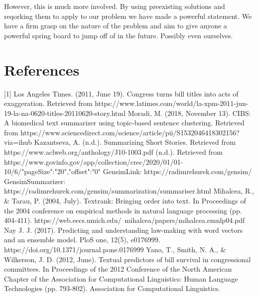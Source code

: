 \documentclass[11pt,a4paper]{article}
\begin{document}
However, this is much more involved. By using preexisting solutions and reqorking them to apply to our problem we have made a powerful statement. We have a firm grasp on the nature of the problem and aim to give anyone a powerful spring board to jump off of in the future. Possibly even ourselves. 
  
  

\clearpage
\section{References}

[1] Los Angeles Times. (2011, June 19). Congress turns bill titles into acts of exaggeration. Retrieved from https://www.latimes.com/world/la-xpm-2011-jun-19-la-na-0620-titles-20110620-story.html 
\newline
\newline
[2] Moradi, M. (2018, November 13). CIBS: A biomedical text summarizer using topic-based sentence clustering. Retrieved from https://www.sciencedirect.com/science/article/pii/S1532046418302156?via=ihub 
\newline
\newline
[3]Kazantseva, A. (n.d.). Summarizing Short Stories. Retrieved from https://www.aclweb.org/anthology/J10-1003.pdf 
\newline
\newline
[4] (n.d.). Retrieved from https://www.govinfo.gov/app/collection/crec/2020/01/01-10/6/{"pageSize":"20","offset":"0"} 
\newline
\newline
[5]GensimLink:
https://radimrehurek.com/gensim/
\newline
\newline
[6]GensimSummarizer:
https://radimrehurek.com/gensim/summarization/summariser.html
\newline
\newline
[7] Mihalcea, R., & Tarau, P. (2004, July). Textrank: Bringing order into text. In Proceedings of the 2004 conference on empirical methods in natural language processing (pp. 404-411).
https://web.eecs.umich.edu/~mihalcea/papers/mihalcea.emnlp04.pdf 
\newline
\newline
[8]Nay J. J. (2017). Predicting and understanding law-making with word vectors and an ensemble model. PloS one, 12(5), e0176999. https://doi.org/10.1371/journal.pone.0176999
\newline
\newline
[9] Yano, T., Smith, N. A., & Wilkerson, J. D. (2012, June). Textual predictors of bill survival in congressional committees. In Proceedings of the 2012 Conference of the North American Chapter of the Association for Computational Linguistics: Human Language Technologies (pp. 793-802). Association for Computational Linguistics.
\end{document}
